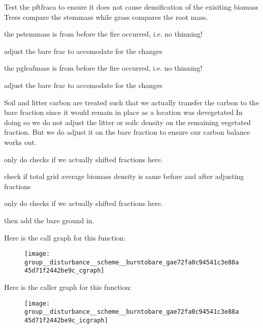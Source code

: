 Test the pftfraca to ensure it does not cause densification of the exisiting biomass Trees compare the stemmass while grass compares the root mass.

the pstemmass is from before the fire occurred, i.\+e. no thinning!

adjust the bare frac to accomodate for the changes

the pgleafmass is from before the fire occurred, i.\+e. no thinning!

adjust the bare frac to accomodate for the changes

Soil and litter carbon are treated such that we actually transfer the carbon to the bare fraction since it would remain in place as a location was devegetated In doing so we do not adjust the litter or soilc density on the remaining vegetated fraction. But we do adjust it on the bare fraction to ensure our carbon balance works out.

only do checks if we actually shifted fractions here.

check if total grid average biomass density is same before and after adjusting fractions

only do checks if we actually shifted fractions here.

then add the bare ground in. 

Here is the call graph for this function\+:\nopagebreak
\begin{figure}[H]
\begin{center}
\leavevmode
\texttt{[image: group\_\_disturbance\_\_scheme\_\_burntobare\_gae72fa0c94541c3e88a45d71f2442be9c\_cgraph]}
\end{center}
\end{figure}




Here is the caller graph for this function\+:\nopagebreak
\begin{figure}[H]
\begin{center}
\leavevmode
\texttt{[image: group\_\_disturbance\_\_scheme\_\_burntobare\_gae72fa0c94541c3e88a45d71f2442be9c\_icgraph]}
\end{center}
\end{figure}


